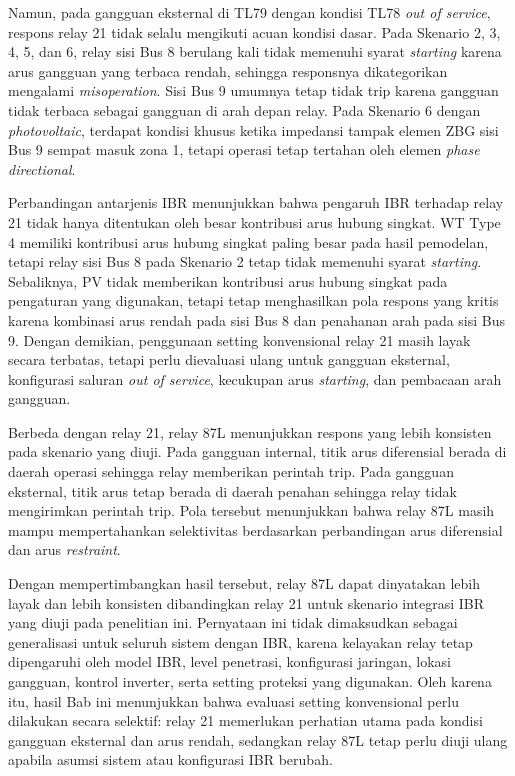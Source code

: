 Namun, pada gangguan eksternal di TL79 dengan kondisi TL78 \textit{out of service}, respons relay 21 tidak selalu mengikuti acuan kondisi dasar. Pada Skenario 2, 3, 4, 5, dan 6, relay sisi Bus 8 berulang kali tidak memenuhi syarat \textit{starting} karena arus gangguan yang terbaca rendah, sehingga responsnya dikategorikan mengalami \textit{misoperation}. Sisi Bus 9 umumnya tetap tidak trip karena gangguan tidak terbaca sebagai gangguan di arah depan relay. Pada Skenario 6 dengan \textit{photovoltaic}, terdapat kondisi khusus ketika impedansi tampak elemen ZBG sisi Bus 9 sempat masuk zona 1, tetapi operasi tetap tertahan oleh elemen \textit{phase directional}.

Perbandingan antarjenis IBR menunjukkan bahwa pengaruh IBR terhadap relay 21 tidak hanya ditentukan oleh besar kontribusi arus hubung singkat. WT Type 4 memiliki kontribusi arus hubung singkat paling besar pada hasil pemodelan, tetapi relay sisi Bus 8 pada Skenario 2 tetap tidak memenuhi syarat \textit{starting}. Sebaliknya, PV tidak memberikan kontribusi arus hubung singkat pada pengaturan yang digunakan, tetapi tetap menghasilkan pola respons yang kritis karena kombinasi arus rendah pada sisi Bus 8 dan penahanan arah pada sisi Bus 9. Dengan demikian, penggunaan setting konvensional relay 21 masih layak secara terbatas, tetapi perlu dievaluasi ulang untuk gangguan eksternal, konfigurasi saluran \textit{out of service}, kecukupan arus \textit{starting}, dan pembacaan arah gangguan.

Berbeda dengan relay 21, relay 87L menunjukkan respons yang lebih konsisten pada skenario yang diuji. Pada gangguan internal, titik arus diferensial berada di daerah operasi sehingga relay memberikan perintah trip. Pada gangguan eksternal, titik arus tetap berada di daerah penahan sehingga relay tidak mengirimkan perintah trip. Pola tersebut menunjukkan bahwa relay 87L masih mampu mempertahankan selektivitas berdasarkan perbandingan arus diferensial dan arus \textit{restraint}.

Dengan mempertimbangkan hasil tersebut, relay 87L dapat dinyatakan lebih layak dan lebih konsisten dibandingkan relay 21 untuk skenario integrasi IBR yang diuji pada penelitian ini. Pernyataan ini tidak dimaksudkan sebagai generalisasi untuk seluruh sistem dengan IBR, karena kelayakan relay tetap dipengaruhi oleh model IBR, level penetrasi, konfigurasi jaringan, lokasi gangguan, kontrol inverter, serta setting proteksi yang digunakan. Oleh karena itu, hasil Bab ini menunjukkan bahwa evaluasi setting konvensional perlu dilakukan secara selektif: relay 21 memerlukan perhatian utama pada kondisi gangguan eksternal dan arus rendah, sedangkan relay 87L tetap perlu diuji ulang apabila asumsi sistem atau konfigurasi IBR berubah.
